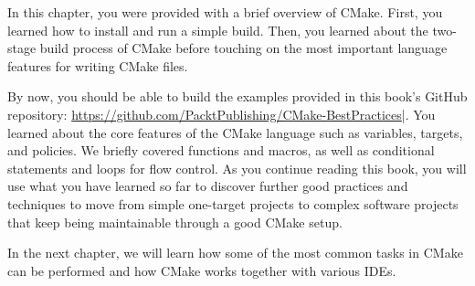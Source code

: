 In this chapter, you were provided with a brief overview of CMake. First, you learned how to install and run a simple build. Then, you learned about the two-stage build process of CMake before touching on the most important language features for writing CMake files.

By now, you should be able to build the examples provided in this book's GitHub repository: \url{https://github.com/PacktPublishing/CMake-BestPractices}|. You learned about the core features of the CMake language such as variables, targets, and policies. We briefly covered functions and macros, as well as conditional statements and loops for flow control. As you continue reading this book, you will use what you have learned so far to discover further good practices and techniques to move from simple one-target projects to complex software projects that keep being maintainable through a good CMake setup.

In the next chapter, we will learn how some of the most common tasks in CMake can be performed and how CMake works together with various IDEs.